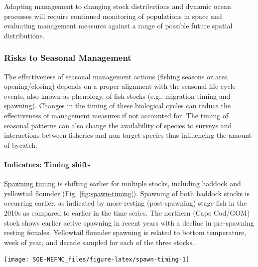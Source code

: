 \documentclass[
  10pt,
]{article}
\let\origfigure\figure
\let\endorigfigure\endfigure
\renewenvironment{figure}[1][2] {
    \expandafter\origfigure\expandafter[H]
} {
    \endorigfigure
}
\begin{document}
Adapting management to changing stock distributions and dynamic ocean processes will require continued monitoring of populations in space and evaluating management measures against a range of possible future spatial distributions.

\hypertarget{risks-to-seasonal-management}{%
\subsubsection{Risks to Seasonal Management}\label{risks-to-seasonal-management}}

The effectiveness of seasonal management actions (fishing seasons or area opening/closing) depends on a proper alignment with the seasonal life cycle events, also known as phenology, of fish stocks (e.g., migration timing and spawning). Changes in the timing of these biological cycles can reduce the effectiveness of management measures if not accounted for. The timing of seasonal patterns can also change the availability of species to surveys and interactions between fisheries and non-target species thus influencing the amount of bycatch.

\hypertarget{indicators-timing-shifts}{%
\paragraph{Indicators: Timing shifts}\label{indicators-timing-shifts}}

\href{https://noaa-edab.github.io/catalog/spawning-timing.html}{Spawning timing} is shifting earlier for multiple stocks, including haddock and yellowtail flounder (Fig. \ref{fig:spawn-timing}). Spawning of both haddock stocks is occurring earlier, as indicated by more resting (post-spawning) stage fish in the 2010s as compared to earlier in the time series. The northern (Cape Cod/GOM) stock shows earlier active spawning in recent years with a decline in pre-spawning resting females. Yellowtail flounder spawning is related to bottom temperature, week of year, and decade sampled for each of the three stocks.

\begin{figure}

{\centering \texttt{[image: SOE-NEFMC\_files/figure-latex/spawn-timing-1]} 

}

\caption{Percent resting stage (non-spawning) fish from two haddock and three yellowtail flounder stocks: CC = Cape Cod Gulf of Maine, GOM = Gulf of Maine, GB = Georges Bank, SNE = Southern New England.}\label{fig:spawn-timing}
\end{figure}
\end{document}
